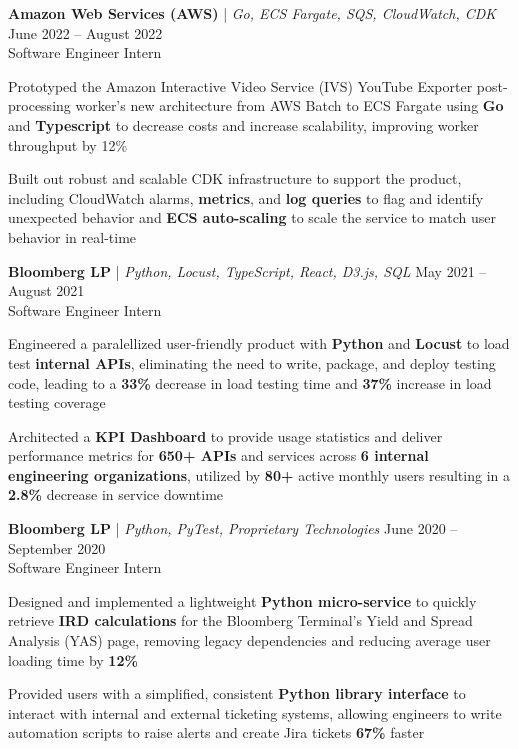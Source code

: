 \documentclass[letterpaper,10pt]{article}
\newcommand{\employer}[4]{{
\vspace*{2pt}%
\textbf{#1} #2 \hfill #3\\ #4 \vspace*{2pt}}
}
\renewcommand{\labelitemii}{
$\vcenter{\hbox{\tiny$\bullet$}}$\hspace*{-3pt}
}
\newenvironment{bullet-list-minor}{
\begin{list}{\labelitemii}{\setlength\leftmargin{15pt} 
\topsep 0pt \itemsep -2pt}}{\vspace*{4pt}\end{list}
}
\begin{document}
    \employer{Amazon Web Services (AWS)}
    {| \textit{Go, ECS Fargate, SQS, CloudWatch, CDK}}{June 2022 -- August 2022}{Software Engineer Intern}
    \begin{bullet-list-minor}
    \item Prototyped the Amazon Interactive Video Service (IVS) YouTube Exporter post-processing worker's new architecture from AWS Batch to ECS Fargate using \textbf{Go} and \textbf{Typescript} to decrease costs and increase scalability, improving worker throughput by 12\%
    \item Built out robust and scalable CDK infrastructure to support the product, including CloudWatch alarms, \textbf{metrics}, and \textbf{log queries} to flag and identify unexpected behavior and \textbf{ECS auto-scaling} to scale the service to match user behavior in real-time
    \end{bullet-list-minor}
    
    \employer{Bloomberg LP}
    {| \textit{Python, Locust, TypeScript, React, D3.js, SQL}}{May 2021 -- August 2021}{Software Engineer Intern}
	\begin{bullet-list-minor}
    \item Engineered a paralellized user-friendly product with \textbf{Python} and \textbf{Locust} to load test \textbf{internal APIs}, eliminating the need to write, package, and deploy testing code, leading to a \textbf{33\%} decrease in load testing time and \textbf{37\%} increase in load testing coverage
	\item Architected a \textbf{KPI Dashboard} to provide usage statistics and deliver performance metrics for \textbf{650+ APIs} and services across \textbf{6 internal engineering organizations}, utilized by \textbf{80+} active monthly users resulting in a \textbf{2.8\%} decrease in service downtime
    \end{bullet-list-minor}

    \employer{Bloomberg LP}
    {| \textit{Python, PyTest, Proprietary Technologies}}{June 2020 -- September 2020}{Software Engineer Intern}
	\begin{bullet-list-minor}
	\item Designed and implemented a lightweight \textbf{Python micro-service} to quickly retrieve \textbf{IRD calculations} for the Bloomberg Terminal's Yield and Spread Analysis (YAS) page, removing legacy dependencies and reducing average user loading time by \textbf{12\%}
	\item Provided users with a simplified, consistent \textbf{Python library interface} to interact with internal and external ticketing systems, allowing engineers to write automation scripts to raise alerts and create Jira tickets\textbf{ 67\%} faster 
    \end{bullet-list-minor}
\end{document}
